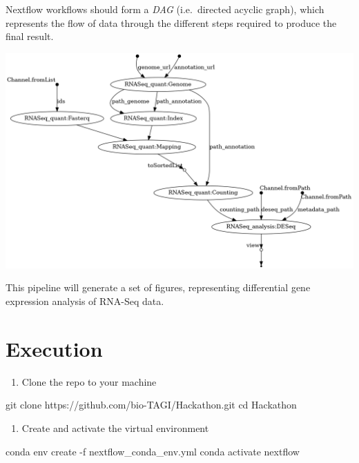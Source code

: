 \documentclass[
  openany]{book}
\newenvironment{Shaded}{\begin{snugshade}}{\end{snugshade}}
\newcommand{\AttributeTok}[1]{\textcolor[rgb]{0.77,0.63,0.00}{#1}}
\newcommand{\BuiltInTok}[1]{#1}
\newcommand{\ExtensionTok}[1]{#1}
\newcommand{\FunctionTok}[1]{\textcolor[rgb]{0.00,0.00,0.00}{#1}}
\newcommand{\NormalTok}[1]{#1}
\providecommand{\tightlist}{%
  \setlength{\itemsep}{0pt}\setlength{\parskip}{0pt}}
\begin{document}
Nextflow workflows should form a \emph{DAG} (i.e.~directed acyclic graph), which represents the flow of data through the different steps
required to produce the final result.

\includegraphics{images/dag.png}

This pipeline will generate a set of figures, representing differential gene expression analysis of RNA-Seq data.

\hypertarget{execution}{%
\chapter{Execution}\label{execution}}

\begin{enumerate}
\def\labelenumi{\arabic{enumi}.}
\tightlist
\item
  Clone the repo to your machine
\end{enumerate}

\begin{Shaded}
\begin{Highlighting}[]
\FunctionTok{git}\NormalTok{ clone https://github.com/bio{-}TAGI/Hackathon.git}
\BuiltInTok{cd}\NormalTok{ Hackathon}
\end{Highlighting}
\end{Shaded}

\begin{enumerate}
\def\labelenumi{\arabic{enumi}.}
\setcounter{enumi}{1}
\tightlist
\item
  Create and activate the virtual environment
\end{enumerate}

\begin{Shaded}
\begin{Highlighting}[]
\ExtensionTok{conda}\NormalTok{ env create }\AttributeTok{{-}f}\NormalTok{ nextflow\_conda\_env.yml}
\ExtensionTok{conda}\NormalTok{ activate nextflow}
\end{Highlighting}
\end{Shaded}
\end{document}
